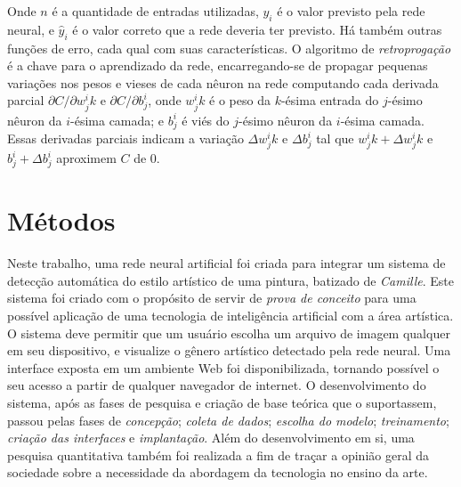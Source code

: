 \documentclass[12pt, a4paper]{article}
\begin{document}
Onde $n$ é a quantidade de entradas utilizadas, $y_i$ é o valor previsto pela rede neural, e $\hat{y}_i$ é o valor correto que a rede deveria ter previsto. Há também outras funções de erro, cada qual com suas características. O algoritmo de \emph{retroprogação} é a chave para o aprendizado da rede, encarregando-se de propagar pequenas variações nos pesos e vieses de cada nêuron na rede computando cada derivada parcial 
$\partial C/\partial w_{j}^{i} k$ e $\partial C/\partial b_{j}^{i}$, onde $w_{j}^{i} k$ é o peso da $k$-ésima entrada do $j$-ésimo nêuron da $i$-ésima camada; e $b_{j}^{i}$ é viés do $j$-ésimo nêuron da $i$-ésima camada. Essas derivadas parciais indicam a variação $\Delta w_{j}^{i} k$ e $\Delta b_{j}^{i}$ tal que 
$w_{j}^{i} k + \Delta w_{j}^{i} k$ e $b_{j}^{i} + \Delta b_{j}^{i}$ aproximem $C$ de 0.

\section{Métodos}
Neste trabalho, uma rede neural artificial foi criada para integrar um sistema de detecção automática do estilo artístico de uma pintura, batizado de \emph{Camille}. 
Este sistema foi criado com o propósito de servir de \emph{prova de conceito} para uma possível aplicação de uma tecnologia de inteligência artificial com a área artística. O sistema deve permitir que um usuário escolha um arquivo de imagem qualquer em seu dispositivo, e visualize o gênero artístico detectado pela rede neural. Uma interface exposta em um ambiente Web foi disponibilizada, tornando possível o seu acesso a partir de qualquer navegador de internet.
O desenvolvimento do sistema, após as fases de pesquisa e criação de base teórica que o suportassem, passou pelas fases de \emph{concepção}; \emph{coleta de dados}; \emph{escolha do modelo}; \emph{treinamento}; \emph{criação das interfaces} e \emph{implantação}. Além do desenvolvimento em si, uma pesquisa quantitativa também foi realizada a fim de traçar a opinião geral da sociedade sobre a necessidade da abordagem da tecnologia no ensino da arte.

\end{document}
